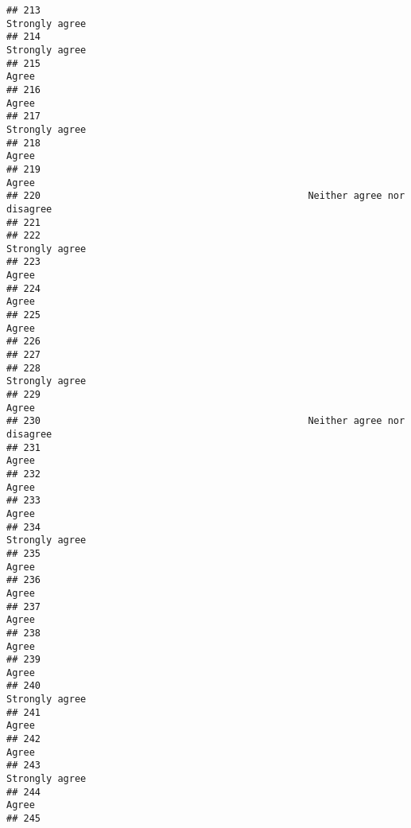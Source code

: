 \documentclass[
]{article}
\begin{document}
\begin{verbatim}
## 213                                                           Strongly agree
## 214                                                           Strongly agree
## 215                                                                    Agree
## 216                                                                    Agree
## 217                                                           Strongly agree
## 218                                                                    Agree
## 219                                                                    Agree
## 220                                               Neither agree nor disagree
## 221                                                                         
## 222                                                           Strongly agree
## 223                                                                    Agree
## 224                                                                    Agree
## 225                                                                    Agree
## 226                                                                         
## 227                                                                         
## 228                                                           Strongly agree
## 229                                                                    Agree
## 230                                               Neither agree nor disagree
## 231                                                                    Agree
## 232                                                                    Agree
## 233                                                                    Agree
## 234                                                           Strongly agree
## 235                                                                    Agree
## 236                                                                    Agree
## 237                                                                    Agree
## 238                                                                    Agree
## 239                                                                    Agree
## 240                                                           Strongly agree
## 241                                                                    Agree
## 242                                                                    Agree
## 243                                                           Strongly agree
## 244                                                                    Agree
## 245                                                                         

\end{verbatim}
\end{document}
